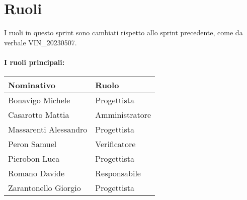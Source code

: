 \section{Ruoli}

I ruoli in questo sprint sono cambiati rispetto allo sprint precedente, come da verbale VIN\_20230507.

\paragraph{I ruoli principali:}

\begin{center}
    \begin{tabularx}{\textwidth}{X l}

        \rowcolor{gray!30} \textbf{Nominativo} & \textbf{Ruolo}\\

        \hline

        Bonavigo Michele & Progettista \\
        \rowcolor{gray!10}Casarotto Mattia & Amministratore \\
        Massarenti Alessandro & Progettista \\
        \rowcolor{gray!10}Peron Samuel & Verificatore \\
        Pierobon Luca & Progettista \\
        \rowcolor{gray!10}Romano Davide & Responsabile \\
        Zarantonello Giorgio & Progettista \\

    \end{tabularx}
\end{center}